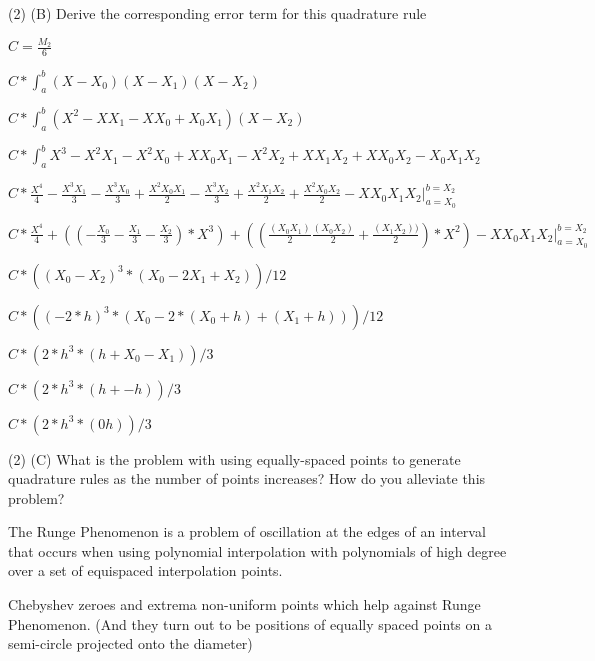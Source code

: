 \documentclass{report}
\begin{document}
 
 \begin{center}
(2) (B) Derive the corresponding error term for this quadrature rule
\end{center}

$C = \frac{M_2}{6}$

$C * \int_{a}^{b} (X - X_0)(X - X_1)(X - X_2)$

$C * \int_{a}^{b} (X^2 - XX_1 - XX_0 + X_0X_1)(X - X_2)$

$C * \int_{a}^{b} X^3 - X^2X_1 - X^2X_0 + XX_0X_1 - X^2X_2 + XX_1X_2 + XX_0X_2 - X_0X_1X_2$

$C * \frac{X^4}{4} - \frac{X^3X_1}{3} - \frac{X^3X_0}{3} + \frac{X^2X_0X_1}{2} - \frac{X^3X_2}{3} + \frac{X^2X_1X_2}{2} + \frac{X^2X_0X_2}{2} - XX_0X_1X_2 \bigg|_{a = X_0}^{b = X_2}$

$C * \frac{X^4}{4} + (( - \frac{X_0}{3} - \frac{X_1}{3} - \frac{X_2}{3}) * X^3) + ((\frac{(X_0X_1)}{2} \frac{(X_0X_2)}{2} + \frac{(X_1X_2))}{2}) * X^2) - XX_0X_1X_2 \bigg|_{a = X_0}^{b = X_2}$

$C * ((X_0 - X_2)^3 * (X_0 - 2X_1 + X_2)) / 12$

$C * ((-2*h)^3*(X_0 -2*(X_0 + h) + (X_1 + h))) /12$

$C * (2*h^3*(h + X_0 - X_1))/3$

$C * (2*h^3*(h + -h))/3$

$C * (2*h^3*(0h))/3$

\begin{center}
(2) (C) What is the problem with using equally-spaced points to generate quadrature rules as the number of points increases? How do you alleviate this problem?


The Runge Phenomenon is a problem of oscillation at the edges of an interval that occurs when using polynomial interpolation with polynomials of high degree over a set of equispaced interpolation points.

Chebyshev zeroes and extrema non-uniform points which help against Runge Phenomenon. (And they turn out to be positions of equally spaced points on a semi-circle projected onto the diameter)

\end{center}
 
  
\end{document}
